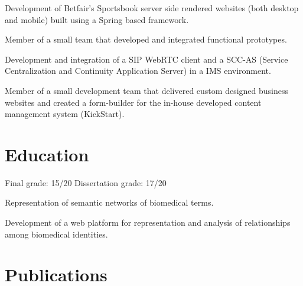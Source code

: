 \documentclass[]{andre-vechina-resume}
\begin{document}
\vspace{\topsep} %
\begin{tightemize}
\item Development of Betfair's Sportsbook server side rendered websites (both desktop and mobile) built using a Spring based framework.
\end{tightemize}
\sectionsep

\begin{tightemize}
\item Member of a small team that developed and integrated functional prototypes.
\item Development and integration of a SIP WebRTC client and a SCC-AS (Service Centralization and Continuity Application Server) in a IMS environment.
\end{tightemize}
\sectionsep

\begin{tightemize}
\item Member of a small development team that delivered custom designed business websites and created a form-builder for the in-house developed content management system (KickStart).
\end{tightemize}
\sectionsep

\section{Education}

Final grade: {\color{subheadings} 15/20}
\tdot
Dissertation grade: {\color{subheadings} 17/20}\\
\begin{tightemize}
\item Representation of semantic networks of biomedical terms.
\item Development of a web platform for representation and analysis of relationships among biomedical identities.
\end{tightemize}
\sectionsep

\section{Publications}



\nocite{*}
\end{document}
